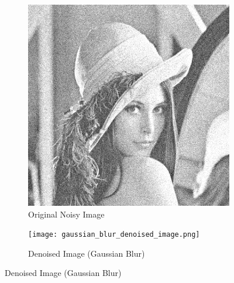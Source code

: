 \documentclass[12pt]{report}
\begin{document}
\begin{figure}[H]
    \centering
    \begin{subfigure}{0.4\textwidth}
        \centering
        \includegraphics[width=\linewidth]{Noisy_Lena.png}
        \caption{Original Noisy Image}
    \end{subfigure}
    \begin{subfigure}{0.4\textwidth}
        \centering
        \texttt{[image: gaussian\_blur\_denoised\_image.png]}
        \caption{Denoised Image (Gaussian Blur)}
    \end{subfigure}
\end{figure}
\end{document}
